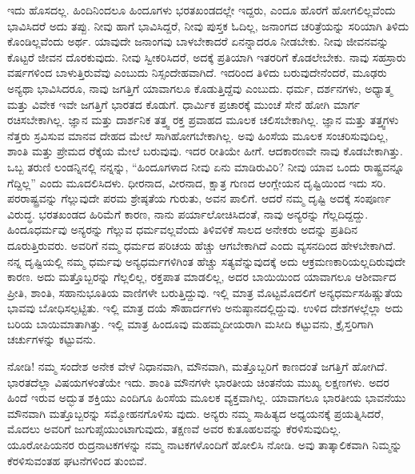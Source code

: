 ಇದು ಹೊಸದಲ್ಲ. ಹಿಂದಿನಿಂದಲೂ ಹಿಂದೂಗಳು ಭರತಖಂಡದಲ್ಲೇ ಇದ್ದರು, ಎಂದೂ ಹೊರಗೆ ಹೋಗಲಿಲ್ಲವೆಂದು ಭಾವಿಸಿದರೆ ಅದು ತಪ್ಪು. ನೀವು ಹಾಗೆ ಭಾವಿಸಿದ್ದರೆ, ನೀವು ಪುಸ್ತಕ ಓದಿಲ್ಲ, ಜನಾಂಗದ ಚರಿತ್ರೆಯನ್ನು ಸರಿಯಾಗಿ ತಿಳಿದು ಕೊಂಡಿಲ್ಲವೆಂದು ಅರ್ಥ. ಯಾವುದೇ ಜನಾಂಗವು ಬಾಳಬೇಕಾದರೆ ಏನನ್ನಾದರೂ ನೀಡಬೇಕು. ನೀವು ಜೀವನವನ್ನು ಕೊಟ್ಟರೆ ಜೀವನ ದೊರಕುವುದು. ನೀವು ಸ್ವೀಕರಿಸಿದರೆ, ಅದಕ್ಕೆ ಪ್ರತಿಯಾಗಿ ಇತರರಿಗೆ ಕೊಡಲೇಬೇಕು. ನಾವು ಸಹಸ್ರಾರು ವರ್ಷಗಳಿಂದ ಬಾಳುತ್ತಿರುವೆವು ಎಂಬುದು ನಿಸ್ಸಂದೇಹವಾಗಿದೆ. ಇದರಿಂದ ತಿಳಿದು ಬರುವುದೇನೆಂದರೆ, ಮೂಢರು ಅನ್ಯಥಾ ಭಾವಿಸಿದರೂ, ನಾವು ಜಗತ್ತಿಗೆ ಯಾವಾಗಲೂ ಕೊಡುತ್ತಿದ್ದೆವು ಎಂಬುದು. ಧರ್ಮ, ದರ್ಶನಗಳು, ಅಧ್ಯಾತ್ಮ ಮತ್ತು ವಿವೇಕ ಇವೇ ಜಗತ್ತಿಗೆ ಭಾರತದ ಕೊಡುಗೆ. ಧಾರ್ಮಿಕ ಪ್ರಚಾರಕ್ಕೆ ಮುಂಚೆ ಸೇನೆ ಹೋಗಿ ಮಾರ್ಗ ರಚಿಸಬೇಕಾಗಿಲ್ಲ. ಜ್ಞಾನ ಮತ್ತು ದಾರ್ಶನಿಕ ತತ್ತ್ವ ರಕ್ತ ಪ್ರವಾಹದ ಮೂಲಕ ಚಲಿಸಬೇಕಾಗಿಲ್ಲ. ಜ್ಞಾನ ಮತ್ತು ತತ್ತ್ವಗಳು ನೆತ್ತರು ಸ್ರವಿಸುವ ಮಾನವ ದೇಹದ ಮೇಲೆ ಸಾಗಿಹೋಗಬೇಕಾಗಿಲ್ಲ. ಅವು ಹಿಂಸೆಯ ಮೂಲಕ ಸಂಚರಿಸುವುದಿಲ್ಲ, ಶಾಂತಿ ಮತ್ತು ಪ್ರೇಮದ ರೆಕ್ಕೆಯ ಮೇಲೆ ಬರುವುವು. ಇದರ ರೀತಿಯೇ ಹೀಗೆ. ಆದಕಾರಣವೇ ನಾವು ಕೊಡಬೇಕಾಗಿತ್ತು. ಒಬ್ಬ ತರುಣಿ ಲಂಡನ್ನಿನಲ್ಲಿ ನನ್ನನ್ನು, “ಹಿಂದೂಗಳಾದ ನೀವು ಏನು ಮಾಡಿರುವಿರಿ? ನೀವು ಯಾವ ಒಂದು ರಾಷ್ಟ್ರವನ್ನೂ ಗೆದ್ದಿಲ್ಲ” ಎಂದು ಮೂದಲಿಸಿದಳು. ಧೀರನಾದ, ವೀರನಾದ, ಕ್ಷಾತ್ರ ಗುಣದ ಆಂಗ್ಲೇಯನ ದೃಷ್ಟಿಯಿಂದ ಇದು ಸರಿ. ಪರರಾಷ್ಟ್ರವನ್ನು ಗೆಲ್ಲುವುದೇ ಪರಮ ಶ್ರೇಷ್ಠತೆಯ ಗುರುತು, ಅವನ ಪಾಲಿಗೆ. ಆದರೆ ನಮ್ಮ ದೃಷ್ಟಿ ಅದಕ್ಕೆ ಸಂಪೂರ್ಣ ವಿರುದ್ಧ. ಭರತಖಂಡದ ಹಿರಿಮೆಗೆ ಕಾರಣ, ನಾನು ಪರ್ಯಾಲೋಚಿಸಿದಂತೆ, ನಾವು ಅನ್ಯರನ್ನು ಗೆಲ್ಲದಿದ್ದದ್ದು. ಹಿಂದೂಧರ್ಮವು ಅನ್ಯರನ್ನು ಗೆಲ್ಲುವ ಧರ್ಮವಲ್ಲವೆಂದು ತಿಳಿವಳಿಕೆ ಸಾಲದ ಅನೇಕರು ಅದನ್ನು ಪ್ರತಿದಿನ ದೂರುತ್ತಿರುವರು. ಅವರಿಗೆ ನಮ್ಮ ಧರ್ಮದ ಪರಿಚಯ ಹೆಚ್ಚು ಆಗಬೇಕಾಗಿದೆ ಎಂದು ವ್ಯಸನದಿಂದ ಹೇಳಬೇಕಾಗಿದೆ. ನನ್ನ ದೃಷ್ಟಿಯಲ್ಲಿ ನಮ್ಮ ಧರ್ಮವು ಅನ್ಯಧರ್ಮಗಳಿಗಿಂತ ಹೆಚ್ಚು ಸತ್ಯವೆನ್ನುವುದಕ್ಕೆ ಅದು ಆಕ್ರಮಣಕಾರಿಯಲ್ಲದಿರುವುದೇ ಕಾರಣ. ಅದು ಮತ್ತೊಬ್ಬರನ್ನು ಗೆಲ್ಲಲಿಲ್ಲ, ರಕ್ತಪಾತ ಮಾಡಲಿಲ್ಲ, ಅದರ ಬಾಯಿಯಿಂದ ಯಾವಾಗಲೂ ಆಶೀರ್ವಾದ ಪ್ರೀತಿ, ಶಾಂತಿ, ಸಹಾನುಭೂತಿಯ ವಾಣಿಗಳೇ ಬರುತ್ತಿದ್ದುವು. ಇಲ್ಲಿ ಮಾತ್ರ ಮೊಟ್ಟಮೊದಲಿಗೆ ಅನ್ಯಧರ್ಮಸಹಿಷ್ಣುತೆಯ ಭಾವವು ಬೋಧಿಸಲ್ಪಟ್ಟಿತು. ಇಲ್ಲಿ ಮಾತ್ರ ದಯೆ ಸೌಹಾರ್ದಗಳು ಅನುಷ್ಠಾನದಲ್ಲಿದ್ದುವು. ಉಳಿದ ದೇಶಗಳಲ್ಲೆಲ್ಲಾ ಅದು ಬರಿಯ ಬಾಯಿಮಾತಾಗಿತ್ತು. ಇಲ್ಲಿ ಮಾತ್ರ ಹಿಂದೂವು ಮಹಮ್ಮದೀಯರಾಗಿ ಮಸೀದಿ ಕಟ್ಟುವನು, ಕ್ರೈಸ್ತರಿಗಾಗಿ ಚರ್ಚುಗಳನ್ನು ಕಟ್ಟುವನು.

ನೋಡಿ! ನಮ್ಮ ಸಂದೇಶ ಅನೇಕ ವೇಳೆ ನಿಧಾನವಾಗಿ, ಮೌನವಾಗಿ, ಮತ್ತೊಬ್ಬರಿಗೆ ಕಾಣದಂತೆ ಜಗತ್ತಿಗೆ ಹೋಗಿದೆ. ಭಾರತದೆಲ್ಲಾ ವಿಷಯಗಳಂತೆಯೇ ಇದು. ಶಾಂತಿ ಮೌನಗಳೇ ಭಾರತೀಯ ಚಿಂತನೆಯ ಮುಖ್ಯ ಲಕ್ಷಣಗಳು. ಅದರ ಹಿಂದೆ ಇರುವ ಅದ್ಭುತ ಶಕ್ತಿಯು ಎಂದಿಗೂ ಹಿಂಸೆಯ ಮೂಲಕ ವ್ಯಕ್ತವಾಗಿಲ್ಲ. ಯಾವಾಗಲೂ ಭಾರತೀಯ ಭಾವನೆಯು ಮೌನವಾಗಿ ಮತ್ತೊಬ್ಬರನ್ನು ಸಮ್ಮೋಹನಗೊಳಿಸು ವುದು. ಅನ್ಯರು ನಮ್ಮ ಸಾಹಿತ್ಯದ ಅಧ್ಯಯನಕ್ಕೆ ಪ್ರಯತ್ನಿಸಿದರೆ, ಮೊದಲು ಅವರಿಗೆ ಜುಗುಪ್ಸೆಯುಂಟಾಗುವುದು, ತಕ್ಷಣವೆ ಅವರ ಕುತೂಹಲವನ್ನು ಕೆರಳಿಸುವುದಿಲ್ಲ. ಯೂರೋಪಿಯನರ ರುದ್ರನಾಟಕಗಳನ್ನು ನಮ್ಮ ನಾಟಕಗಳೊಂದಿಗೆ ಹೋಲಿಸಿ ನೋಡಿ. ಅವು ತಾತ್ಕಾಲಿಕವಾಗಿ ನಿಮ್ಮನ್ನು ಕೆರಳಿಸುವಂತಹ ಘಟನೆಗಳಿಂದ ತುಂಬಿವೆ.

